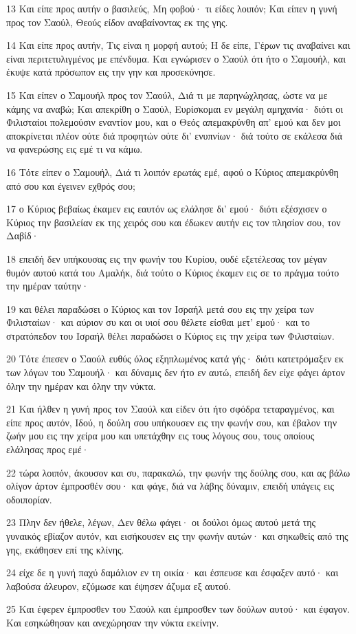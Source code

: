 \par 13 Και είπε προς αυτήν ο βασιλεύς, Μη φοβού· τι είδες λοιπόν; Και είπεν η γυνή προς τον Σαούλ, Θεούς είδον αναβαίνοντας εκ της γης.
\par 14 Και είπε προς αυτήν, Τις είναι η μορφή αυτού; Η δε είπε, Γέρων τις αναβαίνει και είναι περιτετυλιγμένος με επένδυμα. Και εγνώρισεν ο Σαούλ ότι ήτο ο Σαμουήλ, και έκυψε κατά πρόσωπον εις την γην και προσεκύνησε.
\par 15 Και είπεν ο Σαμουήλ προς τον Σαούλ, Διά τι με παρηνώχλησας, ώστε να με κάμης να αναβώ; Και απεκρίθη ο Σαούλ, Ευρίσκομαι εν μεγάλη αμηχανία· διότι οι Φιλισταίοι πολεμούσιν εναντίον μου, και ο Θεός απεμακρύνθη απ' εμού και δεν μοι αποκρίνεται πλέον ούτε διά προφητών ούτε δι' ενυπνίων· διά τούτο σε εκάλεσα διά να φανερώσης εις εμέ τι να κάμω.
\par 16 Τότε είπεν ο Σαμουήλ, Διά τι λοιπόν ερωτάς εμέ, αφού ο Κύριος απεμακρύνθη από σου και έγεινεν εχθρός σου;
\par 17 ο Κύριος βεβαίως έκαμεν εις εαυτόν ως ελάλησε δι' εμού· διότι εξέσχισεν ο Κύριος την βασιλείαν εκ της χειρός σου και έδωκεν αυτήν εις τον πλησίον σου, τον Δαβίδ·
\par 18 επειδή δεν υπήκουσας εις την φωνήν του Κυρίου, ουδέ εξετέλεσας τον μέγαν θυμόν αυτού κατά του Αμαλήκ, διά τούτο ο Κύριος έκαμεν εις σε το πράγμα τούτο την ημέραν ταύτην·
\par 19 και θέλει παραδώσει ο Κύριος και τον Ισραήλ μετά σου εις την χείρα των Φιλισταίων· και αύριον συ και οι υιοί σου θέλετε είσθαι μετ' εμού· και το στρατόπεδον του Ισραήλ θέλει παραδώσει ο Κύριος εις την χείρα των Φιλισταίων.
\par 20 Τότε έπεσεν ο Σαούλ ευθύς όλος εξηπλωμένος κατά γής· διότι κατετρόμαξεν εκ των λόγων του Σαμουήλ· και δύναμις δεν ήτο εν αυτώ, επειδή δεν είχε φάγει άρτον όλην την ημέραν και όλην την νύκτα.
\par 21 Και ήλθεν η γυνή προς τον Σαούλ και είδεν ότι ήτο σφόδρα τεταραγμένος, και είπε προς αυτόν, Ιδού, η δούλη σου υπήκουσεν εις την φωνήν σου, και έβαλον την ζωήν μου εις την χείρα μου και υπετάχθην εις τους λόγους σου, τους οποίους ελάλησας προς εμέ·
\par 22 τώρα λοιπόν, άκουσον και συ, παρακαλώ, την φωνήν της δούλης σου, και ας βάλω ολίγον άρτον έμπροσθέν σου· και φάγε, διά να λάβης δύναμιν, επειδή υπάγεις εις οδοιπορίαν.
\par 23 Πλην δεν ήθελε, λέγων, Δεν θέλω φάγει· οι δούλοι όμως αυτού μετά της γυναικός εβίαζον αυτόν, και εισήκουσεν εις την φωνήν αυτών· και σηκωθείς από της γης, εκάθησεν επί της κλίνης.
\par 24 είχε δε η γυνή παχύ δαμάλιον εν τη οικία· και έσπευσε και έσφαξεν αυτό· και λαβούσα άλευρον, εζύμωσε και έψησεν άζυμα εξ αυτού.
\par 25 Και έφερεν έμπροσθεν του Σαούλ και έμπροσθεν των δούλων αυτού· και έφαγον. Και εσηκώθησαν και ανεχώρησαν την νύκτα εκείνην.

